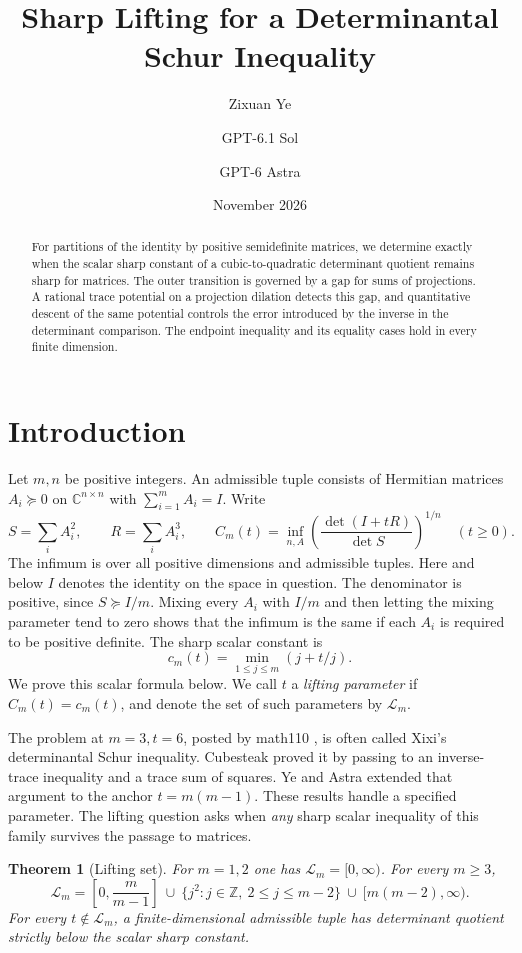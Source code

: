 \documentclass[11pt]{article}
\title{\textbf{Sharp Lifting for a Determinantal Schur Inequality}}
\author{Zixuan Ye \and GPT-6.1 Sol \and GPT-6 Astra}
\date{November 2026}
\newtheorem{theorem}{Theorem}
\begin{document}
\maketitle

\begin{abstract}
For partitions of the identity by positive semidefinite matrices, we determine exactly when the scalar sharp constant of a cubic-to-quadratic determinant quotient remains sharp for matrices. The outer transition is governed by a gap for sums of projections. A rational trace potential on a projection dilation detects this gap, and quantitative descent of the same potential controls the error introduced by the inverse in the determinant comparison. The endpoint inequality and its equality cases hold in every finite dimension.
\end{abstract}

\section{Introduction}

Let \(m,n\) be positive integers. An admissible tuple consists of Hermitian
matrices \(A_i\succeq0\) on \(\mathbb C^{n\times n}\) with \(\sum_{i=1}^m A_i=I\).
Write
\[
S=\sum_i A_i^2,\qquad R=\sum_i A_i^3,\qquad
C_m(t)=\inf_{n,A}\left(\frac{\det(I+tR)}{\det S}\right)^{1/n}
\quad(t\ge0).
\]
The infimum is over all positive dimensions and admissible tuples.
Here and below \(I\) denotes the identity on the space in question. The
denominator is positive, since \(S\succeq I/m\). Mixing every \(A_i\) with
\(I/m\) and then letting the mixing parameter tend to zero shows that the
infimum is the same if each \(A_i\) is required to be positive definite.
The sharp scalar constant is
\[
c_m(t)=\min_{1\le j\le m}(j+t/j).
\]
We prove this scalar formula below. We call \(t\) a \emph{lifting parameter} if
\(C_m(t)=c_m(t)\), and denote the set of such parameters by \(\mathcal L_m\).

The problem at \(m=3,t=6\), posted by math110 \cite{math110}, is often
called Xixi's determinantal Schur inequality. Cubesteak \cite{cube}
proved it by passing to an inverse-trace inequality and a trace
sum of squares. Ye and Astra \cite{anchor} extended that argument
to the anchor \(t=m(m-1)\). These results handle a specified
parameter. The lifting question asks when \emph{any} sharp scalar
inequality of this family survives the passage to matrices.

\begin{theorem}[Lifting set]\label{th:lifting}
For \(m=1,2\) one has \(\mathcal L_m=[0,\infty)\). For every \(m\ge3\),
\[
\displaystyle
\mathcal L_m=\left[0,\frac{m}{m-1}\right]
\ \cup\ \{j^2: j\in\mathbb Z,\ 2\le j\le m-2\}
\ \cup\ [m(m-2),\infty).
\]
For every \(t\notin\mathcal L_m\), a finite-dimensional admissible tuple
has determinant quotient strictly below the scalar sharp constant.
\end{theorem}
\end{document}
